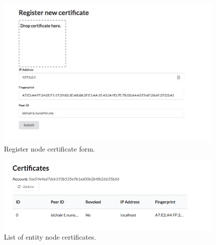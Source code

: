 \begin{figure}
  \centering
  \includegraphics[scale=0.4]{Figures/app-register-certificate.png}
  \caption{Register node certificate form.}
\label{fig:register-certificate}
\end{figure}

\begin{figure}
  \centering
  \includegraphics[scale=0.4]{Figures/app-list-certificates.png}
  \caption{List of entity node certificates.}
\label{fig:list-certificates}
\end{figure}
